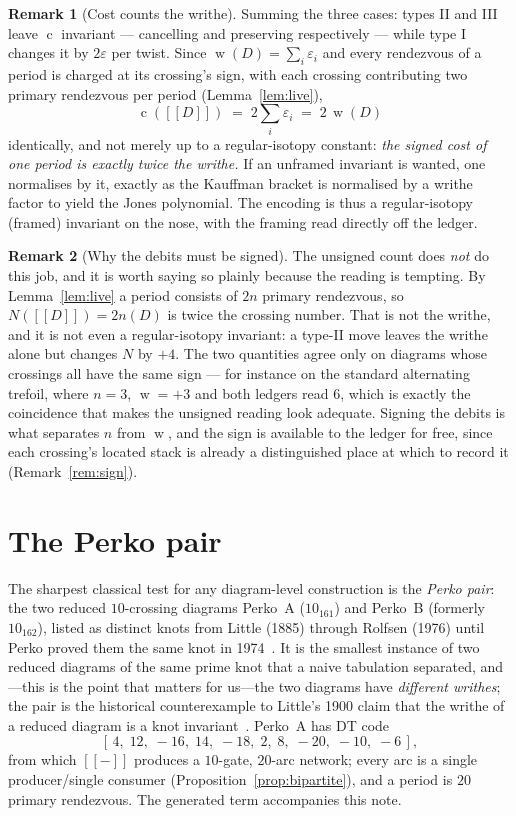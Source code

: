 \documentclass[11pt]{article}
\theoremstyle{definition}
\newtheorem{remark}{Remark}
\newcommand{\enc}[1]{[\![ #1 ]\!]}
\newcommand{\writhe}{\operatorname{w}}
\newcommand{\cost}{\operatorname{c}}
\begin{document}
\begin{remark}[Cost counts the writhe]\label{rem:writhe}
Summing the three cases: types II and III leave $\cost$ invariant --- cancelling
and preserving respectively --- while type I changes it by $2\varepsilon$ per
twist. Since $\writhe(D)=\sum_i\varepsilon_i$ and every rendezvous of a period is
charged at its crossing's sign, with each crossing contributing two primary
rendezvous per period (Lemma~\ref{lem:live}),
\[
\cost(\enc{D}) \;=\; 2\sum_i \varepsilon_i \;=\; 2\,\writhe(D)
\]
identically, and not merely up to a regular-isotopy constant: \emph{the signed
cost of one period is exactly twice the writhe.} If an unframed invariant is
wanted, one normalises by it, exactly as the Kauffman bracket is normalised by a
writhe factor to yield the Jones polynomial. The encoding is thus a
regular-isotopy (framed) invariant on the nose, with the framing read directly off
the ledger.
\end{remark}

\begin{remark}[Why the debits must be signed]\label{rem:unsigned}
The unsigned count does \emph{not} do this job, and it is worth saying so plainly
because the reading is tempting. By Lemma~\ref{lem:live} a period consists of $2n$
primary rendezvous, so $N(\enc{D})=2n(D)$ is twice the crossing number. That is
not the writhe, and it is not even a regular-isotopy invariant: a type-II move
leaves the writhe alone but changes $N$ by $+4$. The two quantities agree only on
diagrams whose crossings all have the same sign --- for instance on the standard
alternating trefoil, where $n=3$, $\writhe=+3$ and both ledgers read $6$, which is
exactly the coincidence that makes the unsigned reading look adequate. Signing the
debits is what separates $n$ from $\writhe$, and the sign is available to the
ledger for free, since each crossing's located stack is already a distinguished
place at which to record it (Remark~\ref{rem:sign}).
\end{remark}

\section{The Perko pair}\label{sec:perko}

The sharpest classical test for any diagram-level construction is the
\emph{Perko pair}: the two reduced $10$-crossing diagrams Perko~A ($10_{161}$) and
Perko~B (formerly $10_{162}$), listed as distinct knots from Little (1885) through
Rolfsen (1976) until Perko proved them the same knot in
1974~\cite{perko,little}. It is the smallest instance of two reduced diagrams of
the same prime knot that a naive tabulation separated, and---this is the point
that matters for us---the two diagrams have \emph{different writhes}; the pair is
the historical counterexample to Little's 1900 claim that the writhe of a reduced
diagram is a knot invariant~\cite{perkopair}. Perko~A has DT code
\[
[\,4,\;12,\;-16,\;14,\;-18,\;2,\;8,\;-20,\;-10,\;-6\,],
\]
from which $\enc{-}$ produces a $10$-gate, $20$-arc network; every arc is a single
producer/single consumer (Proposition~\ref{prop:bipartite}), and a period is $20$
primary rendezvous. The generated term accompanies this note.
\end{document}

